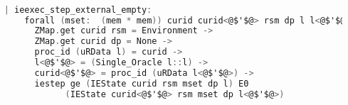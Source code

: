 
\begin{lstlisting}[language=C]

    | ieexec_step_external_empty:
        forall (mset:  (mem * mem)) curid curid<@$'$@> rsm dp l l<@$'$@>,
          ZMap.get curid rsm = Environment ->
          ZMap.get curid dp = None ->
          proc_id (uRData l) = curid ->
          l<@$'$@> = (Single_Oracle l::l) ->
          curid<@$'$@> = proc_id (uRData l<@$'$@>) ->
          iestep ge (IEState curid rsm mset dp l) E0
                (IEState curid<@$'$@> rsm mset dp l<@$'$@>)
\end{lstlisting}


